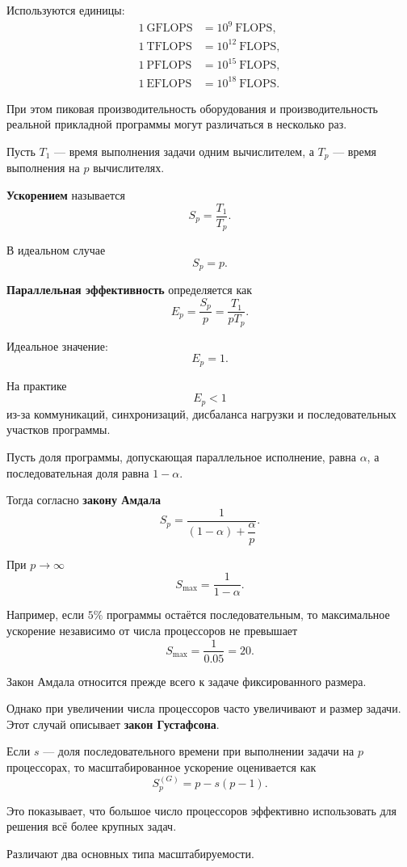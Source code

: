 Используются единицы:
\[
\begin{aligned}
	1~\text{GFLOPS} &= 10^9~\text{FLOPS},\\
	1~\text{TFLOPS} &= 10^{12}~\text{FLOPS},\\
	1~\text{PFLOPS} &= 10^{15}~\text{FLOPS},\\
	1~\text{EFLOPS} &= 10^{18}~\text{FLOPS}.
\end{aligned}
\]

При этом пиковая производительность оборудования и производительность реальной
прикладной программы могут различаться в несколько раз.

Пусть $T_1$ --- время выполнения задачи одним вычислителем,
а $T_p$ --- время выполнения на $p$ вычислителях.

\textbf{Ускорением} называется
\[
S_p = \frac{T_1}{T_p}.
\]

В идеальном случае
\[
S_p = p.
\]

\textbf{Параллельная эффективность} определяется как
\[
E_p = \frac{S_p}{p}
= \frac{T_1}{pT_p}.
\]

Идеальное значение:
\[
E_p = 1.
\]

На практике
\[
E_p < 1
\]
из-за коммуникаций, синхронизаций, дисбаланса нагрузки и последовательных
участков программы.

Пусть доля программы, допускающая параллельное исполнение, равна $\alpha$,
а последовательная доля равна $1-\alpha$.

Тогда согласно \textbf{закону Амдала}
\[
S_p =
\frac{1}
{(1-\alpha)+\dfrac{\alpha}{p}}.
\]

При $p\rightarrow\infty$
\[
S_{\max} =
\frac{1}{1-\alpha}.
\]

Например, если $5\%$ программы остаётся последовательным,
то максимальное ускорение независимо от числа процессоров не превышает
\[
S_{\max} = \frac{1}{0.05}=20.
\]

Закон Амдала относится прежде всего к задаче фиксированного размера.

Однако при увеличении числа процессоров часто увеличивают и размер задачи.
Этот случай описывает \textbf{закон Густафсона}.

Если $s$ --- доля последовательного времени при выполнении задачи на $p$
процессорах, то масштабированное ускорение оценивается как
\[
S_p^{(G)}
= p-s(p-1).
\]

Это показывает, что большое число процессоров эффективно использовать
для решения всё более крупных задач.

Различают два основных типа масштабируемости.

